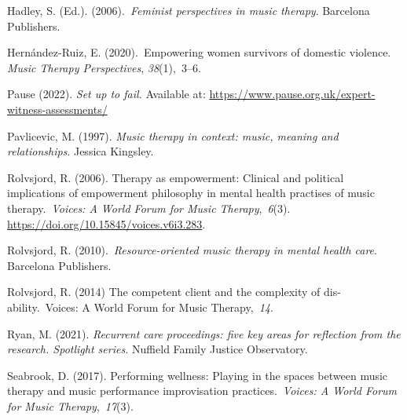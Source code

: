 \documentclass[authordate, empirical]{jote-new-article}
\begin{document}
Hadley, S. (Ed.). (2006). \emph{Feminist perspectives in music therapy}. Barcelona Publishers.







Hernández-Ruiz, E. (2020). Empowering women survivors of domestic violence. \emph{Music Therapy Perspectives}, \emph{38}(1), 3--6.







Pause (2022). \emph{Set up to fail. }Available at: \href{https://www.pause.org.uk/expert-witness-assessments/}{https://www.pause.org.uk/expert-witness-assessments/}







Pavlicevic, M. (1997). \emph{Music therapy in context: music, meaning and relationships}. Jessica Kingsley.







Rolvsjord, R. (2006). Therapy as empowerment: Clinical and political implications of empowerment philosophy in mental health practises of music therapy. \emph{Voices: A World Forum for Music Therapy}, \emph{6}(3). \href{https://doi.org/10.15845/voices.v6i3.283}{https://doi.org/10.15845/voices.v6i3.283}.







Rolvsjord, R. (2010). \emph{Resource-oriented music therapy in mental health care}. Barcelona Publishers.







Rolvsjord, R. (2014) The competent client and the complexity of dis-ability. Voices: A World Forum for Music Therapy, \emph{14}.







Ryan, M. (2021). \emph{Recurrent care proceedings: five key areas for reflection from the research. Spotlight series.} Nuffield Family Justice Observatory.







Seabrook, D. (2017). Performing wellness: Playing in the spaces between music therapy and music performance improvisation practices. \emph{Voices: A World Forum for Music Therapy}, \emph{17}(3).
\end{document}
